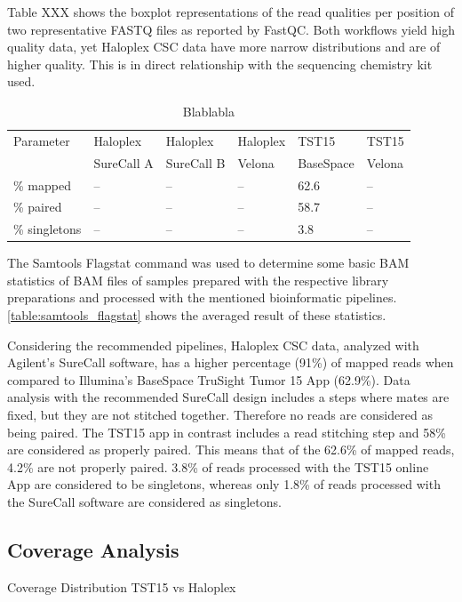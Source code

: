 Table XXX shows the boxplot representations of the read qualities per position
of two representative FASTQ files as reported by FastQC. Both workflows yield high
quality data, yet Haloplex CSC data have more narrow distributions and are of higher
quality. This is in direct relationship with the sequencing chemistry kit used.

\begin{table}[!htbp]
  \caption[samtools_flagstat]{Blablabla}
  \centering
  \begin{tabular}{|p{2cm}|p{2cm}|p{2cm}|p{2cm}|p{2cm}|p{2cm}|}
  \hline
  Parameter & Haloplex & Haloplex & Haloplex & TST15 & TST15 \\
  & SureCall A & SureCall B & Velona & BaseSpace & Velona \\ \hline \hline
  \% mapped & -- & -- & -- & 62.6 & -- \\
  \% paired & -- & -- & -- & 58.7 & -- \\
  \% singletons & -- & -- & -- & 3.8 & -- \\ \hline
  \end{tabular}
\end{table}

The Samtools Flagstat command was used to determine some basic BAM statistics of
BAM files of samples prepared with the respective library preparations and
processed with the mentioned bioinformatic pipelines.
\ref{table:samtools_flagstat} shows the averaged result of these statistics.

Considering the recommended pipelines, Haloplex CSC data, analyzed with
Agilent's SureCall software, has a higher percentage (91\%) of mapped reads when
compared to Illumina's BaseSpace TruSight Tumor 15 App (62.9\%). Data analysis
with the recommended SureCall design includes a steps where mates are fixed, but
they are not stitched together. Therefore no reads are considered as being
paired. The TST15 app in contrast includes a read stitching step and 58\% are
considered as properly paired. This means that of the 62.6\% of mapped reads,
4.2\% are not properly paired. 3.8\% of reads processed with the TST15 online
App are considered to be singletons, whereas only 1.8\% of reads processed with
the SureCall software are considered as singletons.

\subsection{Coverage Analysis}

Coverage Distribution TST15 vs Haloplex

